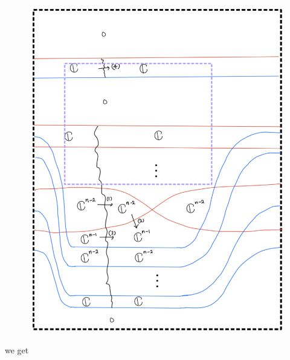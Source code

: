 \begin{enumerate}[label = (\roman*)]
\begin{enumerate}[label = (Case \arabic*)]
\begin{enumerate}[label = (Step \arabic*)]
\begin{figure}[H]
    \centering
    \includegraphics[scale = 0.95]{diagrams/cobord_gen/14.png}
    \caption{}
    \label{fig:your-label}
\end{figure}

we get


\end{enumerate}
\end{enumerate}
\end{enumerate}
